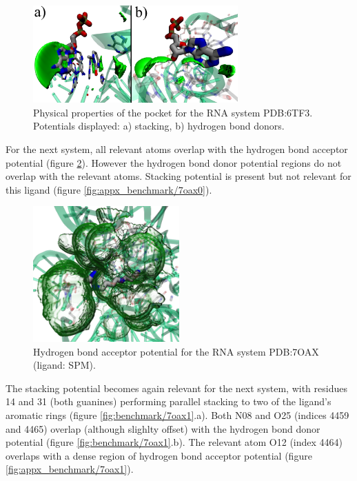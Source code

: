    \begin{figure}[H]
      \centering
      \includegraphics[width=0.7\textwidth]{figures/results/benchmark_rna/6tf3.png}
      \caption{\label{fig:benchmark/6tf3} Physical properties of the pocket for the RNA system PDB:6TF3. Potentials displayed: a) stacking, b) hydrogen bond donors.}
    \end{figure}

    For the next system, all relevant atoms overlap with the hydrogen bond acceptor potential (figure \ref{fig:benchmark/7oax0}). However the hydrogen bond donor potential regions do not overlap with the relevant atoms. Stacking potential is present but not relevant for this ligand (figure \ref{fig:appx_benchmark/7oax0}).

    \begin{figure}[H]
      \centering
      \includegraphics[width=0.5\textwidth]{figures/results/benchmark_rna/7oax0.png}
      \caption{\label{fig:benchmark/7oax0} Hydrogen bond acceptor potential for the RNA system PDB:7OAX (ligand: SPM).}
    \end{figure}

    The stacking potential becomes again relevant for the next system, with residues 14 and 31 (both guanines) performing parallel stacking to two of the ligand's aromatic rings (figure \ref{fig:benchmark/7oax1}.a). Both N08 and O25 (indices 4459 and 4465) overlap (although slighlty offset) with the hydrogen bond donor potential (figure \ref{fig:benchmark/7oax1}.b). The relevant atom O12 (index 4464) overlaps with a dense region of hydrogen bond acceptor potential (figure \ref{fig:appx_benchmark/7oax1}).

